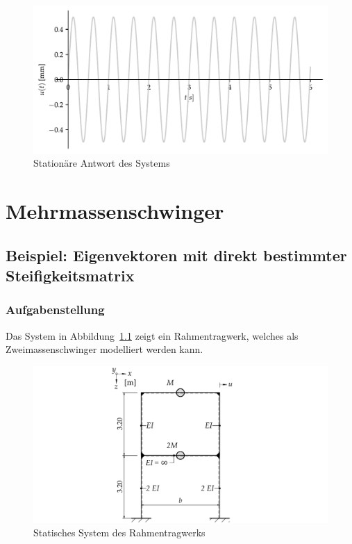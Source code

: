 \documentclass[
  letterpaper,
  DIV=11]{scrreprt}
\begin{document}
\begin{figure}[H]

{\centering \includegraphics{index_files/mediabag/ems_07_files/figure-pdf/fig-ems_untilg_stationaer_antwort-output-1.pdf}

}

\caption{\label{fig-ems_untilg_stationaer_antwort}Stationäre Antwort des
Systems}

\end{figure}

\part{Mehrmassenschwinger}

\hypertarget{sec-mms_steif}{%
\chapter{Beispiel: Eigenvektoren mit direkt bestimmter
Steifigkeitsmatrix}\label{sec-mms_steif}}

\hypertarget{aufgabenstellung-10}{%
\section{Aufgabenstellung}\label{aufgabenstellung-10}}

Das System in Abbildung~\ref{fig-mms_steif_system_mms2} zeigt ein
Rahmentragwerk, welches als Zweimassenschwinger modelliert werden kann.

\begin{figure}[H]

{\centering \includegraphics{index_files/mediabag/bilder/aufgabe_mms_steif_system.pdf}

}

\caption{\label{fig-mms_steif_system_mms2}Statisches System des
Rahmentragwerks}

\end{figure}
\end{document}
